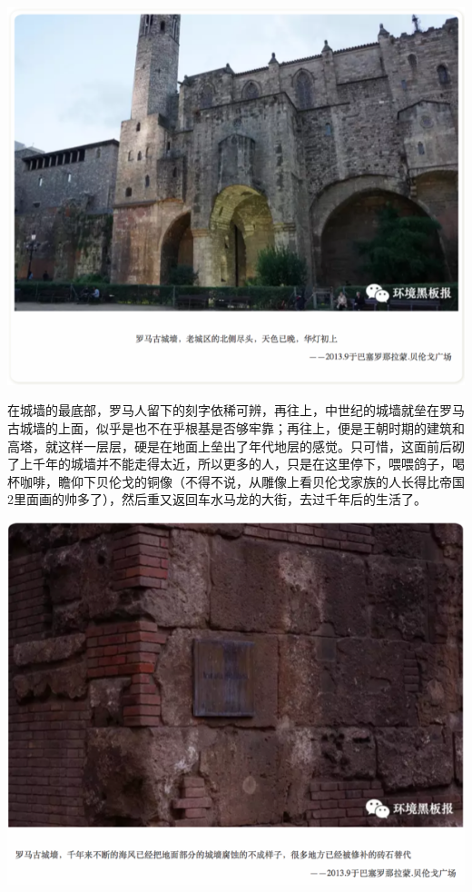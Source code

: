 \documentclass[
]{book}
\begin{document}
\includegraphics[width=8.33in]{images/xt20}

在城墙的最底部，罗马人留下的刻字依稀可辨，再往上，中世纪的城墙就垒在罗马古城墙的上面，似乎是也不在乎根基是否够牢靠；再往上，便是王朝时期的建筑和高塔，就这样一层层，硬是在地面上垒出了年代地层的感觉。只可惜，这面前后砌了上千年的城墙并不能走得太近，所以更多的人，只是在这里停下，喂喂鸽子，喝杯咖啡，瞻仰下贝伦戈的铜像（不得不说，从雕像上看贝伦戈家族的人长得比帝国2里面画的帅多了），然后重又返回车水马龙的大街，去过千年后的生活了。

\includegraphics[width=8.33in]{images/xt21}
\end{document}
